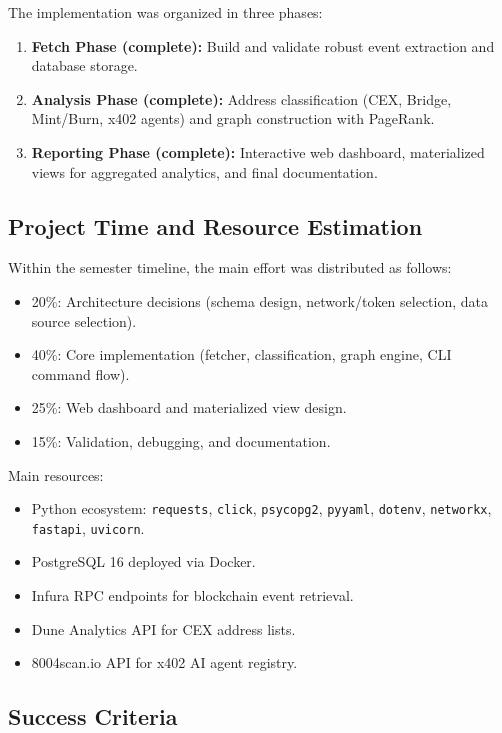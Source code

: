 \documentclass[a4paper,12pt]{report}
\begin{document}
The implementation was organized in three phases:

\begin{enumerate}
\item \textbf{Fetch Phase (complete):} Build and validate robust event extraction and database
storage.
\item \textbf{Analysis Phase (complete):} Address classification (CEX, Bridge, Mint/Burn, x402
agents) and graph construction with PageRank.
\item \textbf{Reporting Phase (complete):} Interactive web dashboard, materialized views for
aggregated analytics, and final documentation.
\end{enumerate}

\subsection{Project Time and Resource Estimation}

Within the semester timeline, the main effort was distributed as follows:

\begin{itemize}
\item 20\%: Architecture decisions (schema design, network/token selection, data source selection).
\item 40\%: Core implementation (fetcher, classification, graph engine, CLI command flow).
\item 25\%: Web dashboard and materialized view design.
\item 15\%: Validation, debugging, and documentation.
\end{itemize}

Main resources:

\begin{itemize}
\item Python ecosystem: \texttt{requests}, \texttt{click}, \texttt{psycopg2}, \texttt{pyyaml},
\texttt{dotenv}, \texttt{networkx}, \texttt{fastapi}, \texttt{uvicorn}.
\item PostgreSQL 16 deployed via Docker.
\item Infura RPC endpoints for blockchain event retrieval.
\item Dune Analytics API for CEX address lists.
\item 8004scan.io API for x402 AI agent registry.
\end{itemize}

\subsection{Success Criteria}
\end{document}
